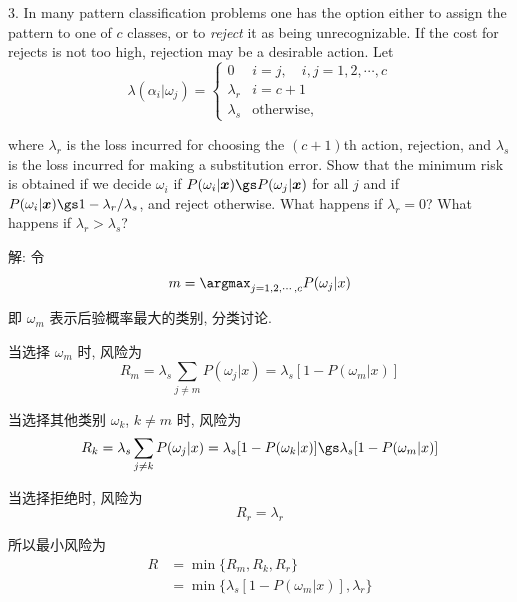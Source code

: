 \documentclass[openany]{ctexbook}
\theoremstyle{kaiti}
\theoremstyle{normal}
\begin{document}
3. In many pattern classification problems one has the option either to assign the pattern to one of $c$ classes, or to \emph{reject} it as being unrecognizable. If the cost for rejects is not too high, rejection may be a desirable action. Let
\begin{equation}
  \lambda(\alpha_i|\omega_j)=
  \left\{
    \begin{array}{ll}
    0         & i=j, \quad i,j=1,2,\cdots, c  \\
    \lambda_r & i = c+1 \\
    \lambda_s & \mathrm{otherwise},  
    \end{array}
  \right.
\end{equation}

where $\lambda_r$ is the loss incurred for choosing the $(c+1)$th action, rejection, and $\lambda_s$ is the loss incurred for making a substitution error. Show that the minimum risk is obtained if we decide $\omega_i$ if $P(\omega_i|\bm{x})\gs P(\omega_j|\bm{x})$ for all $j$ and if $P(\omega_i|\bm{x})\gs 1-\lambda_r/\lambda_s$, and reject otherwise. What happens if $\lambda_r=0$? What happens if $\lambda_r>\lambda_s$?

解: 令
\begin{equation}
  m=\argmax_{j=1,2,\cdots,c}P(\omega_j|x)
\end{equation}

即 $\omega_m$ 表示后验概率最大的类别, 分类讨论. 

当选择 $\omega_m$ 时, 风险为
\begin{equation}
  R_m=\lambda_s\sum_{j\neq m}P(\omega_j|x)=\lambda_s[1-P(\omega_m|x)]
\end{equation}

当选择其他类别 $\omega_k$, $k\neq m$ 时, 风险为
\begin{equation}
  R_k=\lambda_s\sum_{j\neq k}P(\omega_j|x)=\lambda_s[1-P(\omega_k|x)]\gs\lambda_s[1-P(\omega_m|x)]
\end{equation}

当选择拒绝时, 风险为
\begin{equation}
  R_r=\lambda_r
\end{equation}

所以最小风险为
\begin{equation}
  \begin{aligned}
    R
    &=\min\{R_m,R_k,R_r\}\\
    &=\min\{\lambda_s[1-P(\omega_m|x)],\lambda_r\}\\
  \end{aligned}
\end{equation}
\end{document}
